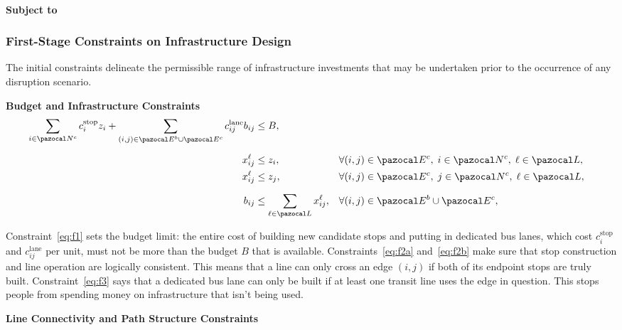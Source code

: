 \documentclass[3p,times,procedia]{elsarticle}
\begin{document}
\paragraph{Subject to}
\subsubsection{First-Stage Constraints on Infrastructure Design}

The initial constraints delineate the permissible range of infrastructure investments that may be undertaken prior to the occurrence of any disruption scenario. 

\textbf{Budget and Infrastructure Constraints}
\begin{align}
\sum_{i \in \pazocal N^c} c_i^{\text{stop}} z_i 
+ \sum_{(i,j) \in \pazocal E^b \cup \pazocal E^{c}} c_{ij}^{\text{lane}} b_{ij} 
&\leq B,
\label{eq:f1} \\[6pt]
x_{ij}^\ell &\leq z_i, 
&& \forall (i,j) \in \pazocal E^c,\; i \in \pazocal N^c,\; \ell \in \pazocal L ,
\label{eq:f2a} \\
x_{ij}^\ell &\leq z_j, 
&& \forall (i,j) \in \pazocal E^c,\; j \in \pazocal N^c,\; \ell \in \pazocal L ,
\label{eq:f2b} \\[6pt]
b_{ij} &\leq \sum_{\ell \in \pazocal L} x_{ij}^\ell, 
&& \forall (i,j) \in \pazocal E^b \cup \pazocal E^c ,
\label{eq:f3}
\end{align}

Constraint~\eqref{eq:f1} sets the budget limit: the entire cost of building new candidate stops and putting in dedicated bus lanes, which cost $c_i^{\text{stop}}$ and $c_{ij}^{\text{lane}}$ per unit, must not be more than the budget $B$ that is available.  
Constraints~\eqref{eq:f2a} and~\eqref{eq:f2b} make sure that stop construction and line operation are logically consistent. This means that a line can only cross an edge $(i,j)$ if both of its endpoint stops are truly built.  
Constraint~\eqref{eq:f3} says that a dedicated bus lane can only be built if at least one transit line uses the edge in question. This stops people from spending money on infrastructure that isn't being used.

\textbf{Line Connectivity and Path Structure Constraints}
\end{document}
